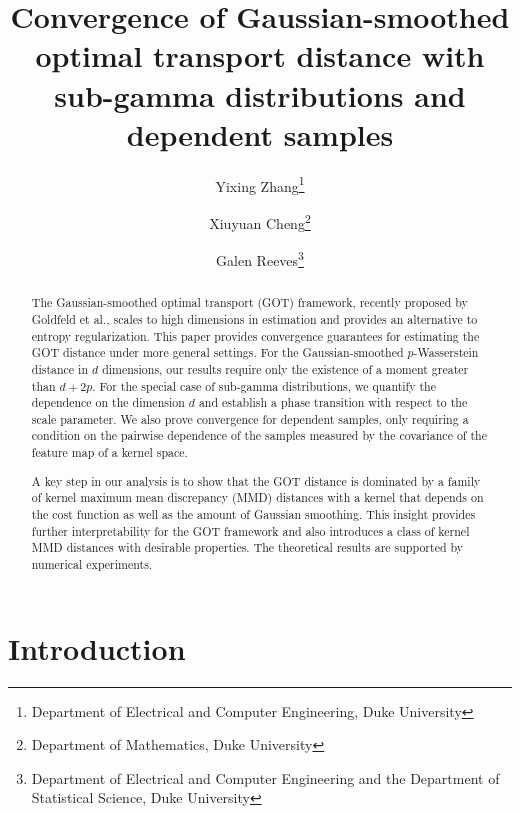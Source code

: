 \documentclass{article}
\title{Convergence of  Gaussian-smoothed optimal transport distance with sub-gamma distributions and  dependent samples}
\author{Yixing Zhang\thanks{Department of Electrical and Computer Engineering, Duke University}  \and  Xiuyuan Cheng\thanks{Department of Mathematics, Duke University} \and Galen Reeves\thanks{Department of Electrical and Computer Engineering and the Department of Statistical Science, Duke University}}
\theoremstyle{definition}
\begin{document}
\ifarxiv
\maketitle

\else
{}



\fi

\begin{abstract}
The Gaussian-smoothed optimal transport (GOT) framework, recently proposed by Goldfeld et al.,  scales to high dimensions in estimation and provides an alternative to entropy regularization. This paper provides convergence guarantees for estimating the GOT distance under more general settings. For the Gaussian-smoothed $p$-Wasserstein distance in $d$ dimensions, our results require only the existence of a moment greater than $d + 2p$. For the special case of sub-gamma distributions, we quantify the dependence on the dimension $d$ and establish a phase transition with respect to the scale parameter. We also prove convergence for dependent samples, only requiring a condition on the pairwise dependence of the samples measured by the covariance of the feature map of a kernel space. 

A key step in our analysis is to show that the GOT distance is dominated by a family of kernel maximum mean discrepancy (MMD) distances with a kernel that depends on the cost function as well as the amount of Gaussian smoothing.  This insight provides further interpretability for the GOT framework and also introduces a class of kernel MMD distances with desirable properties.  The theoretical results are supported by numerical experiments.

\end{abstract}


\ifarxiv
\tableofcontents
\fi


\section{Introduction}
\end{document}
